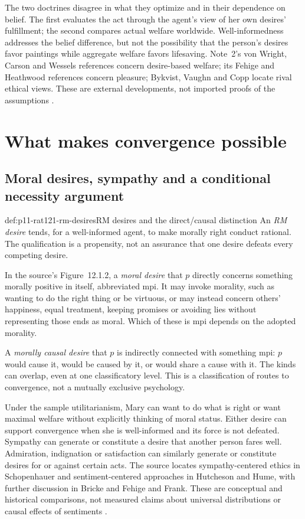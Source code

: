 The two doctrines disagree in what they optimize and in their
dependence on belief. The first evaluates the act through the
agent's view of her own desires' fulfillment; the second compares
actual welfare worldwide. Well-informedness addresses the belief
difference, but not the possibility that the person's desires favor
paintings while aggregate welfare favors lifesaving. Note~2's
von Wright, Carson and Wessels references concern desire-based welfare;
its Fehige and Heathwood references concern pleasure; Bykvist,
Vaughn and Copp locate rival ethical views. These are external
developments, not imported proofs of the assumptions
\parencite[p.~682 and n.~2]{FehigeWessels2021Morality}.

\section{What makes convergence possible}
\label{sec:p11-rat121-desires}

\subsection{Moral desires, sympathy and a conditional necessity argument}

\begin{hbdefinition}{def:p11-rat121-rm-desires}{RM desires and the direct/causal distinction}
An \emph{RM desire} tends, for a well-informed agent, to make morally
right conduct rational. The qualification is a propensity, not an
assurance that one desire defeats every competing desire.

In the source's Figure~12.1.2, a \emph{moral desire} that \(p\)
directly concerns something morally positive in itself, abbreviated
\(\mathrm{mpi}\). It may invoke morality, such as wanting to do
the right thing or be virtuous, or may instead concern others'
happiness, equal treatment, keeping promises or avoiding lies without
representing those ends as moral. Which of these is \(\mathrm{mpi}\)
depends on the adopted morality.

A \emph{morally causal desire} that \(p\) is indirectly connected
with something \(\mathrm{mpi}\): \(p\) would cause it, would
be caused by it, or would share a cause with it. The kinds can
overlap, even at one classificatory level. This is a classification
of routes to convergence, not a mutually exclusive psychology.
\end{hbdefinition}

Under the sample utilitarianism, Mary can want to do what is right
or want maximal welfare without explicitly thinking of moral status.
Either desire can support convergence when she is well-informed and
its force is not defeated. Sympathy can generate or constitute a
desire that another person fares well. Admiration, indignation or
satisfaction can similarly generate or constitute desires for or
against certain acts. The source locates sympathy-centered ethics
in Schopenhauer and sentiment-centered approaches in Hutcheson and
Hume, with further discussion in Bricke and Fehige and Frank.
These are conceptual and historical comparisons, not measured claims
about universal distributions or causal effects of sentiments
\parencite[pp.~682--683 and nn.~3--4]{FehigeWessels2021Morality}.

